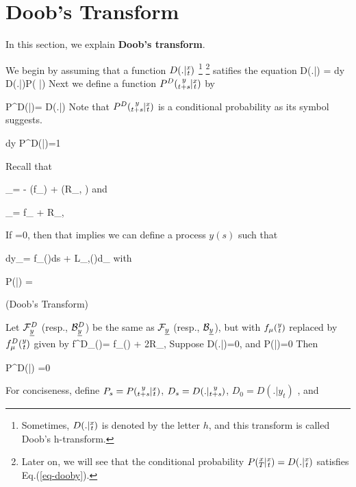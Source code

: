 \section{Doob's Transform}
In this section, we explain {\bf Doob's transform}.

We begin by assuming that a function
$D(.|{\substack{x\\t}})$ \footnote{Sometimes, $D(.|{\substack{x\\t}})$ is denoted by the letter $h$, and this transform is called Doob's h-transform.}
\footnote{Later on, we will see that the conditional probability
$P({\substack{x\\T}}|{\substack{x\\t}})=D(.|{\substack{x\\t}})$
satisfies Eq.(\ref{eq-dooby}).}
satifies the equation
\beq
D(.|)
=
\int dy\; D(.|)P( |)
\label{eq-dooby}
\eeq
Next we define a function
$P^D({\substack{y\\t+s}}|{\substack{x\\t}})$ by

\beq
P^D(|)=
{D(.|)}
\eeq
Note that $P^D({\substack{y\\t+s}}|{\substack{x\\t}})$
is a conditional probability as its symbol
suggests.

\beq
\int dy\; P^D(|)=1
\eeq






Recall that

\beq
\calf_\rvx \bullet=
-\;
(\bullet f_\mu) +
(\bullet R_{\mu, \nu})
\eeq
and

\beq
\calb_\rvx \bullet=
f_\mu{}
 + R_{\mu, \nu}
\eeq

If
\beq
{} \phi{}=0,
\eeq
then that implies we can define a process $y(s)$
such that

\beq
dy_\mu = f_\mu()ds + L_{\mu,\nu}()d\rvB_\nu
\eeq
with

\beq
P(|) =\phi{}
\eeq


\begin{claim} (Doob's Transform)
 \label{cl-doobs-transform}

Let $\calf_\rvy^D$ (resp.,
$\calb_\rvy^{D}$) be the
	same as $\calf_\rvy$ (resp.,
	$\calb_\rvy$), but with $f_\mu({\substack{y\\t}})$
	replaced by $f^D_\mu({\substack{y\\t}})$
		given by
		\beq
		f^D_\mu()=
		f_\mu() +
		2R_{\mu, \nu}
		\eeq
Suppose
\beq
{} D(.|)=0,
\eeq
and
\beq
{}
P(|)=0
\eeq
Then
	
\beq
{}
P^D(|)
=0
\eeq

	
\end{claim}
\proof
For conciseness, define
$P_s=P({\substack{y\\t+s}}|{\substack{x\\t}})$, $D_s=D(.|{\substack{y\\t+s}})$, $D_0=D(.|y_{t})$
, and

